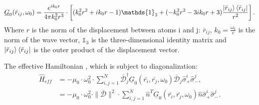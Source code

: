 \documentclass{article}
\begin{document}
\begin{equation}\label{eq:Greens}
    \underline{G}_0 (\bar{r}_{ij}, \omega_0) = \frac{e^{ik_0r}}{4\pi k_0^2 r^3} \cdot \left[ (k_0^2r^2 + ik_0r - 1) \mathds{1}_3 + (-k_0^2 r^2 -3ik_0r + 3) \frac{\ket{\bar{r}_{ij}}\bra{\bar{r}_{ij}}}{r^2} \right].
\end{equation}
Where $r$ is the norm of the displacement between atoms i and j: $\bar{r}_{ij}$, $k_0=\frac{\omega_0}{c}$ is the norm of the wave vector, $\mathds{1}_3$ is the three-dimensional identity matrix and $\ket{\bar{r}_{ij}}\bra{\bar{r}_{ij}}$ is the outer product of the displacement vector. 

The effective Hamiltonian \cite[Equation 5]{Asenjo}, which is subject to diagonalization:
\begin{equation}\label{eq:Heff}
    \begin{split}
        \hat{H}_{eff} &= - \mu_0 \cdot \omega_0^2 \cdot \sum_{i,j = 1}^N \bar{\mathscr{D}}_j^\dagger \underline{G}_0(\bar{r_i}, \bar{r_j}, \omega_0) \bar{\mathscr{D}}_j \hat{\sigma}_+^i \hat{\sigma}_-^j, \\
        &=- \mu_0 \cdot \omega_0^2 \cdot \|\bar{\mathscr{D}}\|^2 \cdot \sum_{i,j = 1}^N \hat{n}^T \underline{G}_0(\bar{r_i}, \bar{r_j}, \omega_0) \hat{n} \hat{\sigma}_+^i \hat{\sigma}_-^j. \\
    \end{split}
\end{equation}
\end{document}
